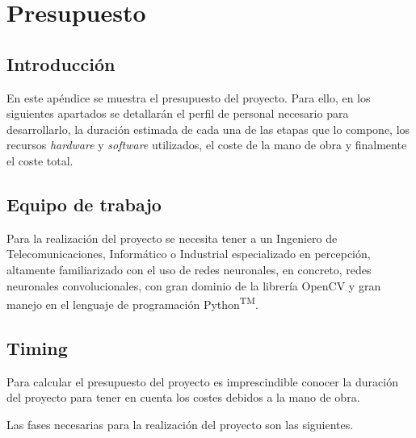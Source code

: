 
\chapter{Presupuesto}
\label{cha:presupuesto}

\section{Introducción}
\label{sec:intro-presupuesto}

En este apéndice se muestra el presupuesto del proyecto. Para ello, en los siguientes apartados se detallarán el perfil de personal necesario para desarrollarlo, la duración estimada de cada una de las etapas que lo compone, los recursos \textit{hardware} y \textit{software} utilizados, el coste de la mano de obra y finalmente el coste total.

\section{Equipo de trabajo}
\label{sec:equipo-presupuesto}

Para la realización del proyecto se necesita tener a un Ingeniero de Telecomunicaciones, Informático o Industrial especializado en percepción, altamente familiarizado con el uso de redes neuronales, en concreto, redes neuronales convolucionales, con gran dominio de la librería OpenCV y gran manejo en el lenguaje de programación Python\textsuperscript{TM}.

\section{Timing}
\label{sec:timing-presupuesto}

Para calcular el presupuesto del proyecto es imprescindible conocer la duración del proyecto para tener en cuenta los costes debidos a la mano de obra.

Las fases necesarias para la realización del proyecto son las siguientes.

